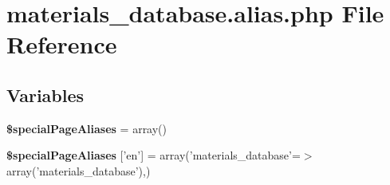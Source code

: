 \hypertarget{materials__database_8alias_8php}{\section{materials\+\_\+database.\+alias.\+php File Reference}
\label{materials__database_8alias_8php}
}
\subsection*{Variables}
\begin{DoxyCompactItemize}
\item 
\hypertarget{materials__database_8alias_8php_a91b4dc26e740598b926d012d8f82d7b9}{{\bfseries \$special\+Page\+Aliases} = array()}\label{materials__database_8alias_8php_a91b4dc26e740598b926d012d8f82d7b9}

\item 
\hypertarget{materials__database_8alias_8php_a1a0ddfa71d1ce23d2cbd1b61003709a6}{{\bfseries \$special\+Page\+Aliases} \mbox{[}'en'\mbox{]} = array('materials\+\_\+database'=$>$array('materials\+\_\+database'),)}\label{materials__database_8alias_8php_a1a0ddfa71d1ce23d2cbd1b61003709a6}

\end{DoxyCompactItemize}
